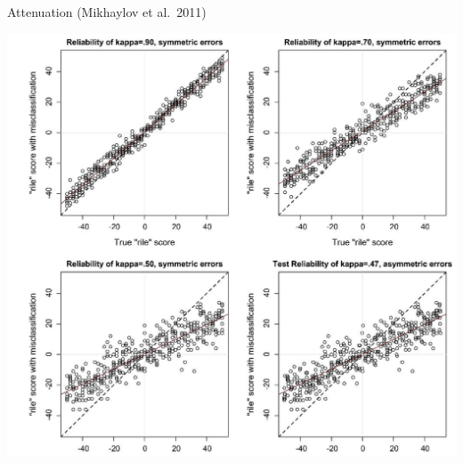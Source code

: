 \documentclass{hertieteaching}
\begin{document}
\begin{frame}{Attenuation (Mikhaylov et al.~2011)}
\protect\hypertarget{attenuation-mikhaylov-et-al.-2011}{}

\begin{center}\includegraphics[width=16.39in,height=0.8\textheight]{pictures/slava-rile} \end{center}

\end{frame}
\end{document}
